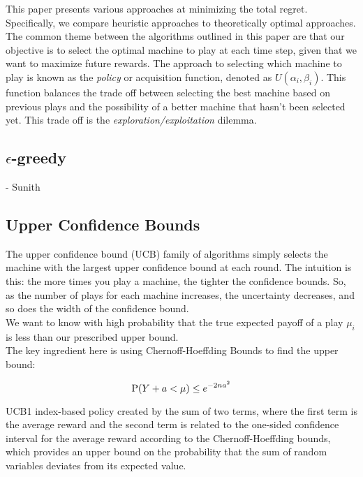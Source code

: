 \documentclass{article}
\begin{document}
This paper presents various approaches at minimizing the total regret. Specifically, we compare heuristic approaches to theoretically optimal approaches.\\

The common theme between the algorithms outlined in this paper are that our objective is to select the optimal machine to play at each time step, given that we want to maximize future rewards. The approach to selecting which machine to play is known as the \textit{policy} or acquisition function, denoted as $U(\alpha_i, \beta_i)$. This function balances the trade off between selecting the best machine based on previous plays and the possibility of a better machine that hasn't been selected yet. This trade off is the \textit{exploration/exploitation} dilemma.\\


\subsection{$\epsilon$-greedy}

- Sunith

\subsection{Upper Confidence Bounds}

The upper confidence bound (UCB) family of algorithms simply selects the machine with the largest upper confidence bound at each round.  The intuition is this: the more times you play a machine, the tighter the confidence bounds. So, as the number of plays for each machine increases, the uncertainty decreases, and so does the width of the confidence bound.\\

We want to know with high probability that the true expected payoff of a play $\mu_i$ is less than our prescribed upper bound.\\

The key ingredient here is using Chernoff-Hoeffding Bounds to find the upper bound:

$$\displaystyle \textup{P}(Y + a < \mu) \leq e^{-2na^2}$$

UCB1 index-based policy created by the sum of two terms, where the first term is the average reward and the second term is related to the one-sided confidence interval for the average reward according to the Chernoff-Hoeffding bounds, which provides an upper bound on the probability that the sum of random variables deviates from its expected value.\\
\end{document}
